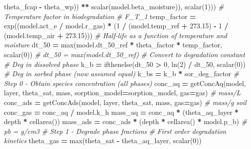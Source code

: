 \documentclass[]{article}
\newenvironment{Shaded}{\begin{snugshade}}{\end{snugshade}}
\newcommand{\DecValTok}[1]{\textcolor[rgb]{0.00,0.00,0.81}{#1}}
\newcommand{\FloatTok}[1]{\textcolor[rgb]{0.00,0.00,0.81}{#1}}
\newcommand{\CommentTok}[1]{\textcolor[rgb]{0.56,0.35,0.01}{\textit{#1}}}
\newcommand{\OperatorTok}[1]{\textcolor[rgb]{0.81,0.36,0.00}{\textbf{#1}}}
\newcommand{\BuiltInTok}[1]{#1}
\newcommand{\NormalTok}[1]{#1}
\begin{document}
\begin{Shaded}
\begin{Highlighting}[]
\NormalTok{                       theta_fcap }\OperatorTok{-}\NormalTok{ theta_wp)) }\OperatorTok{**}\NormalTok{ scalar(model.beta_moisture)),}
\NormalTok{                   scalar(}\DecValTok{1}\NormalTok{)))}
    \CommentTok{# Temperature factor in biodegradation}
    \CommentTok{# F_T_1}
\NormalTok{    temp_factor }\OperatorTok{=}\NormalTok{ exp((model.act_e }\OperatorTok{/}\NormalTok{ model.r_gas) }\OperatorTok{*}
\NormalTok{                      (}\DecValTok{1} \OperatorTok{/}\NormalTok{ (model.temp_ref }\OperatorTok{+} \FloatTok{273.15}\NormalTok{) }\OperatorTok{-} \DecValTok{1} \OperatorTok{/}\NormalTok{ (model.temp_air }\OperatorTok{+} \FloatTok{273.15}\NormalTok{)))}
    \CommentTok{# Half-life as a function of temperature and moisture}
\NormalTok{    dt_50 }\OperatorTok{=} \BuiltInTok{max}\NormalTok{(model.dt_50_ref }\OperatorTok{*}\NormalTok{ theta_factor }\OperatorTok{*}\NormalTok{ temp_factor, scalar(}\DecValTok{0}\NormalTok{))}
    \CommentTok{# dt_50 = max(model.dt_50_ref)}
    \CommentTok{# Convert to degradation constant}
    \CommentTok{# Deg in dissolved phase}
\NormalTok{    k_b }\OperatorTok{=}\NormalTok{ ifthenelse(dt_50 }\OperatorTok{>} \DecValTok{0}\NormalTok{, ln(}\DecValTok{2}\NormalTok{) }\OperatorTok{/}\NormalTok{ dt_50,}
\NormalTok{                     scalar(}\DecValTok{0}\NormalTok{))  }
    \CommentTok{# Deg in sorbed phase (now assumed equal)}
\NormalTok{    k_bs }\OperatorTok{=}\NormalTok{ k_b }\OperatorTok{*}\NormalTok{ sor_deg_factor}
    \CommentTok{# Step 0 - Obtain species concentration (all phases)}
\NormalTok{    conc_aq }\OperatorTok{=}\NormalTok{ getConcAq(model, layer, theta_sat, mass,}
\NormalTok{                        sorption_model}\OperatorTok{=}\NormalTok{sorption_model, gas}\OperatorTok{=}\NormalTok{gas)  }\CommentTok{# mass/L}
\NormalTok{    conc_ads }\OperatorTok{=}\NormalTok{ getConcAds(model, layer, theta_sat, mass, gas}\OperatorTok{=}\NormalTok{gas)  }\CommentTok{# mass/g soil}
\NormalTok{    conc_gas }\OperatorTok{=}\NormalTok{ conc_aq }\OperatorTok{/}\NormalTok{ model.k_h}
\NormalTok{    mass_aq }\OperatorTok{=}\NormalTok{ conc_aq }\OperatorTok{*}\NormalTok{ (theta_aq_layer }\OperatorTok{*}\NormalTok{ depth }\OperatorTok{*}\NormalTok{ cellarea())}
\NormalTok{    mass_ads }\OperatorTok{=}\NormalTok{ conc_ads }\OperatorTok{*}\NormalTok{ (depth }\OperatorTok{*}\NormalTok{ cellarea() }\OperatorTok{*}\NormalTok{ model.p_b)  }\CommentTok{# pb = g/cm3}
    \CommentTok{# Step 1 - Degrade phase fractions}
    \CommentTok{# First order degradation kinetics}
\NormalTok{    theta_gas }\OperatorTok{=} \BuiltInTok{max}\NormalTok{(theta_sat }\OperatorTok{-}\NormalTok{ theta_aq_layer, scalar(}\DecValTok{0}\NormalTok{))}

\end{Highlighting}
\end{Shaded}
\end{document}
